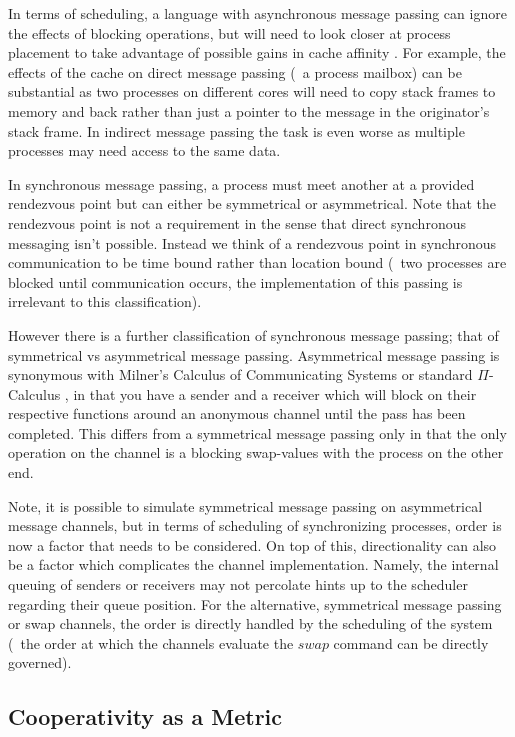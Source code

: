 In terms of scheduling, a language with asynchronous message passing can ignore the effects of blocking operations, but
will need to look closer at process placement to take advantage of possible gains in cache affinity \cite{debattista2002cache}.
For example, the effects of the cache on direct message passing (\eg~a process mailbox) can be substantial as two processes
on different cores will need to copy stack frames to memory and back rather than just a pointer to the message in the 
originator's stack frame. In indirect message passing the task is even worse as multiple processes may need access to the
same data.

In synchronous message passing, a process must meet another at a provided rendezvous point but can either be symmetrical
or asymmetrical. Note that the rendezvous point is not a requirement in the sense that direct synchronous messaging isn't 
possible. Instead we think of a rendezvous point in synchronous communication to be time bound rather than location bound (\ie~two
processes are blocked until communication occurs, the implementation of this passing is irrelevant to this 
classification).

However there is a further classification of synchronous message passing; that of symmetrical vs asymmetrical message passing. 
Asymmetrical message passing is synonymous with Milner's Calculus of Communicating Systems \cite{milner1982calculus} 
or standard $\Pi$-Calculus \cite{palamidessi1997comparing}, in that you have a sender and a receiver which will 
block on their respective functions around an anonymous channel until the pass has been completed. This differs from a 
symmetrical message passing only in that the only operation on the channel is a blocking swap-values with the
process on the other end. 

Note, it is possible to simulate symmetrical message passing on asymmetrical message channels, but in terms of scheduling of
synchronizing processes, order is now a factor that needs to be considered. On top of this, directionality can also be a factor
which complicates the channel implementation. Namely, the internal queuing of senders or receivers may not percolate hints up to
the scheduler regarding their queue position. For the alternative, symmetrical message passing or swap channels, the order is
directly handled by the scheduling of the system (\ie~the order at which the channels evaluate the $swap$ command can be 
directly governed).

\subsection{Cooperativity as a Metric}

